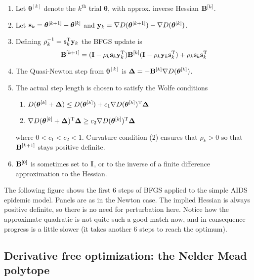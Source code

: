 \documentclass[10pt] {article}
\newcommand{\ts}{^{\rm T}}
\newcommand{\eps}[3]
{{\begin{center}
 \rotatebox{#1}{\scalebox{#2}{\texttt{[image: \#3]}}}
 \end{center}}
}
\theoremstyle{definition}
\begin{document}
\begin{enumerate}
\item Let ${\bm \theta}^{[k]}$ denote the $k^\text{th}$ trial $\bm \theta$, with approx. inverse Hessian ${\bf B}^{[k]}$.
\item Let ${\bf s}_k = {\bm \theta}^{[k+1]} -{\bm \theta}^{[k]} $ and ${\bf y}_k = \nabla D({\bm \theta}^{[k+1]}) - \nabla D({\bm \theta}^{[k]})$.
\item Defining $\rho_k^{-1} = {\bf s}_k\ts {\bf y}_k$ the BFGS update is
$$
{\bf B}^{[k+1]} = ({\bf I} - \rho_k {\bf s}_k {\bf y}_k\ts){\bf B}^{[k]}({\bf I} - \rho_k {\bf y}_k {\bf s}_k\ts)
+ \rho_k {\bf s}_k {\bf s}_k\ts
$$
\item The Quasi-Newton step from ${\bm \theta}^{[k]}$ is ${\bm \Delta} = - {\bf B}^{[k]} \nabla D({\bm \theta}^{[k]})$.
\item The actual step length is chosen to satisfy the Wolfe conditions
\begin{enumerate}
\item $D({\bm \theta}^{[k]}+{\bm \Delta}) \le D({\bm \theta}^{[k]}) + c_1 \nabla D({\bm \theta}^{[k]})\ts {\bm \Delta}$
\item $\nabla D({\bm \theta}^{[k]}+{\bm \Delta})\ts {\bm \Delta} \ge c_2 \nabla D({\bm \theta}^{[k]})\ts {\bm \Delta}$
\end{enumerate}
where $0<c_1<c_2<1$. Curvature condition (2) ensures that $\rho_k>0$ so that ${\bf B}^{[k+1]}$ stays positive definite.
\item ${\bf B}^{[0]}$ is sometimes set to $\bf I$, or to the inverse of a finite difference approximation to the Hessian. \end{enumerate}
The following figure shows the first 6 steps of BFGS applied to the simple AIDS epidemic model. Panels are as in the Newton case. The implied Hessian is always positive definite, so there is no need for perturbation here. Notice how the approximate quadratic is not quite such a good match now, and in consequence progress is a little slower (it takes another 6 steps to reach the optimum). 

\eps{-90}{.45}{bfgs-aids.eps}

\subsection{Derivative free optimization: the Nelder Mead polytope}
\end{document}
